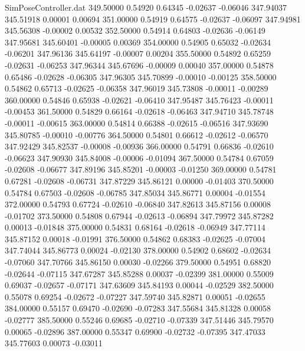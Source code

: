 \begin{filecontents}{SimPoseController.dat}
 349.50000    0.54920    0.64345    -0.02637   -0.06046  347.94037  345.51918    0.00001    0.00694
 351.00000    0.54919    0.64575    -0.02637   -0.06097  347.94981  345.56308   -0.00002    0.00532
 352.50000    0.54914    0.64803    -0.02636   -0.06149  347.95681  345.60401   -0.00005    0.00369
 354.00000    0.54905    0.65032    -0.02634   -0.06201  347.96136  345.64197   -0.00007    0.00204
 355.50000    0.54892    0.65259    -0.02631   -0.06253  347.96344  345.67696   -0.00009    0.00040
 357.00000    0.54878    0.65486    -0.02628   -0.06305  347.96305  345.70899   -0.00010   -0.00125
 358.50000    0.54862    0.65713    -0.02625   -0.06358  347.96019  345.73808   -0.00011   -0.00289
 360.00000    0.54846    0.65938    -0.02621   -0.06410  347.95487  345.76423   -0.00011   -0.00453
 361.50000    0.54829    0.66164    -0.02618   -0.06463  347.94710  345.78748   -0.00011   -0.00615
 363.00000    0.54814    0.66388    -0.02615   -0.06516  347.93690  345.80785   -0.00010   -0.00776
 364.50000    0.54801    0.66612    -0.02612   -0.06570  347.92429  345.82537   -0.00008   -0.00936
 366.00000    0.54791    0.66836    -0.02610   -0.06623  347.90930  345.84008   -0.00006   -0.01094
 367.50000    0.54784    0.67059    -0.02608   -0.06677  347.89196  345.85201   -0.00003   -0.01250
 369.00000    0.54781    0.67281    -0.02608   -0.06731  347.87229  345.86121    0.00000   -0.01403
 370.50000    0.54784    0.67503    -0.02608   -0.06785  347.85034  345.86771    0.00004   -0.01554
 372.00000    0.54793    0.67724    -0.02610   -0.06840  347.82613  345.87156    0.00008   -0.01702
 373.50000    0.54808    0.67944    -0.02613   -0.06894  347.79972  345.87282    0.00013   -0.01848
 375.00000    0.54831    0.68164    -0.02618   -0.06949  347.77114  345.87152    0.00018   -0.01991
 376.50000    0.54862    0.68383    -0.02625   -0.07004  347.74044  345.86773    0.00024   -0.02130
 378.00000    0.54902    0.68602    -0.02634   -0.07060  347.70766  345.86150    0.00030   -0.02266
 379.50000    0.54951    0.68820    -0.02644   -0.07115  347.67287  345.85288    0.00037   -0.02399
 381.00000    0.55009    0.69037    -0.02657   -0.07171  347.63609  345.84193    0.00044   -0.02529
 382.50000    0.55078    0.69254    -0.02672   -0.07227  347.59740  345.82871    0.00051   -0.02655
 384.00000    0.55157    0.69470    -0.02690   -0.07283  347.55684  345.81328    0.00058   -0.02777
 385.50000    0.55246    0.69685    -0.02710   -0.07339  347.51446  345.79570    0.00065   -0.02896
 387.00000    0.55347    0.69900    -0.02732   -0.07395  347.47033  345.77603    0.00073   -0.03011

\end{filecontents}

